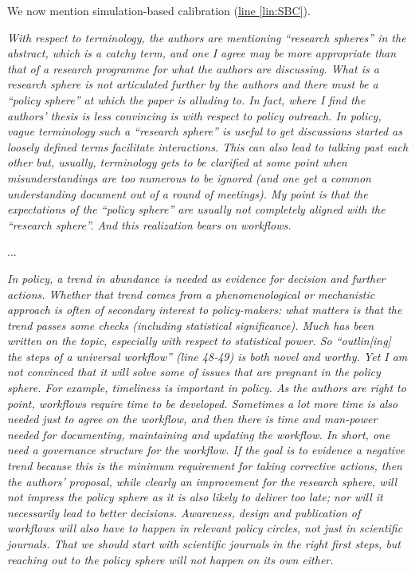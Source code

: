 \documentclass[11pt,letter]{article}
\begin{document}
We now mention simulation-based calibration (\href{file:forecastflows_r2\#lintarget:SBC}{line \ref*{lin:SBC}}).

\begin{mybox}
\emph{With respect to terminology, the authors are mentioning “research spheres” in the abstract,
which is a catchy term, and one I agree may be more appropriate than that of a research
programme for what the authors are discussing. What is a research sphere is not articulated
further by the authors and there must be a “policy sphere” at which the paper is alluding to. In
fact, where I find the authors’ thesis is less convincing is with respect to policy outreach. In
policy, vague terminology such a “research sphere” is useful to get discussions started as
loosely defined terms facilitate interactions. This can also lead to talking past each other but,
usually, terminology gets to be clarified at some point when misunderstandings are too
numerous to be ignored (and one get a common understanding document out of a round of
meetings). My point is that the expectations of the “policy sphere” are usually not completely
aligned with the “research sphere”. And this realization bears on workflows.}  
\end{mybox}

...

\begin{mybox}
\emph{In policy, a trend in abundance is needed as evidence for decision and further actions. Whether
that trend comes from a phenomenological or mechanistic approach is often of secondary
interest to policy-makers: what matters is that the trend passes some checks (including
statistical significance). Much has been written on the topic, especially with respect to
statistical power. So “outlin[ing] the steps of a universal workflow” (line 48-49) is both novel
and worthy. Yet I am not convinced that it will solve some of issues that are pregnant in the
policy sphere. For example, timeliness is important in policy. As the authors are right to point,
workflows require time to be developed. Sometimes a lot more time is also needed just to agree
on the workflow, and then there is time and man-power needed for documenting, maintaining
and updating the workflow. In short, one need a governance structure for the workflow. If the
goal is to evidence a negative trend because this is the minimum requirement for taking
corrective actions, then the authors’ proposal, while clearly an improvement for the research
sphere, will not impress the policy sphere as it is also likely to deliver too late; nor will it
necessarily lead to better decisions. Awareness, design and publication of workflows will also
have to happen in relevant policy circles, not just in scientific journals. That we should start
with scientific journals in the right first steps, but reaching out to the policy sphere will not
happen on its own either.}  
\end{mybox}
\end{document}
